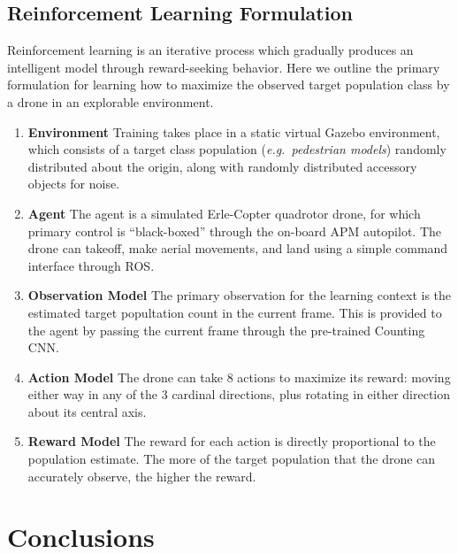 \documentclass[10pt,twocolumn,letterpaper]{article}
\begin{document}

\subsection{Reinforcement Learning Formulation}

  Reinforcement learning is an iterative process which gradually produces an
  intelligent model through reward-seeking behavior. Here we outline the
  primary formulation for learning how to maximize the observed target
  population class by a drone in an explorable environment.

  \begin{enumerate}
  \item \textbf{Environment}
    Training takes place in a static virtual Gazebo environment, which consists
    of a target class population (\textit{e.g.\ pedestrian models}) randomly
    distributed about the origin, along with randomly distributed accessory
    objects for noise.
  \item \textbf{Agent}
    The agent is a simulated Erle-Copter quadrotor drone, for which primary
    control is ``black-boxed'' through the on-board APM autopilot. The drone
    can takeoff, make aerial movements, and land using a simple command
    interface through ROS.
  \item \textbf{Observation Model}
    The primary observation for the learning context is the estimated target
    popultation count in the current frame. This is provided to the agent by
    passing the current frame through the pre-trained Counting CNN.
  \item \textbf{Action Model}
    The drone can take 8 actions to maximize its reward: moving either way in
    any of the 3 cardinal directions, plus rotating in either direction about
    its central axis.
  \item \textbf{Reward Model}
    The reward for each action is directly proportional to the population
    estimate. The more of the target population that the drone can accurately
    observe, the higher the reward.
  \end{enumerate}


\section{Conclusions}
\end{document}

